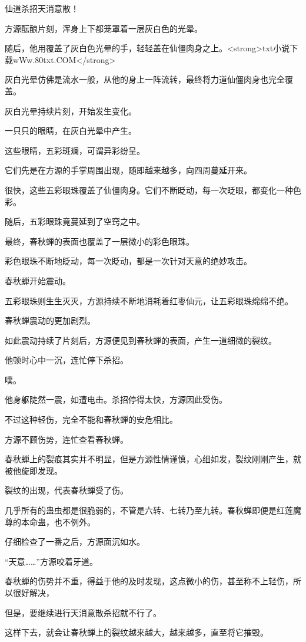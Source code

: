 \begin{this_body}
仙道杀招天消意散！

方源酝酿片刻，浑身上下都笼罩着一层灰白色的光晕。

随后，他用覆盖了灰白色光晕的手，轻轻盖在仙僵肉身之上。<strong>txt小说下载wWw.80txt.COM</strong>

灰白光晕仿佛是流水一般，从他的身上一阵流转，最终将力道仙僵肉身也完全覆盖。

灰白光晕持续片刻，开始发生变化。

一只只的眼睛，在灰白光晕中产生。

这些眼睛，五彩斑斓，可谓异彩纷呈。

它们先是在方源的手掌周围出现，随即越来越多，向四周蔓延开来。

很快，这些五彩眼珠覆盖了仙僵肉身。它们不断眨动，每一次眨眼，都变化一种色彩。

随后，五彩眼珠竟蔓延到了空窍之中。

最终，春秋蝉的表面也覆盖了一层微小的彩色眼珠。

彩色眼珠不断地眨动，每一次眨动，都是一次针对天意的绝妙攻击。

春秋蝉开始震动。

五彩眼珠则生生灭灭，方源持续不断地消耗着红枣仙元，让五彩眼珠绵绵不绝。

春秋蝉震动的更加剧烈。

如此震动持续了片刻后，方源便见到春秋蝉的表面，产生一道细微的裂纹。

他顿时心中一沉，连忙停下杀招。

噗。

他身躯陡然一震，如遭电击。杀招停得太快，方源因此受伤。

不过这种轻伤，完全不能和春秋蝉的安危相比。

方源不顾伤势，连忙查看春秋蝉。

春秋蝉上的裂痕其实并不明显，但是方源性情谨慎，心细如发，裂纹刚刚产生，就被他旋即发现。

裂纹的出现，代表春秋蝉受了伤。

几乎所有的蛊虫都是很脆弱的，不管是六转、七转乃至九转。春秋蝉即便是红莲魔尊的本命蛊，也不例外。

仔细检查了一番之后，方源面沉如水。

“天意……”方源咬着牙道。

春秋蝉的伤势并不重，得益于他的及时发现，这点微小的伤，甚至称不上轻伤，所以很好解决，

但是，要继续进行天消意散杀招就不行了。

这样下去，就会让春秋蝉上的裂纹越来越大，越来越多，直至将它摧毁。


\end{this_body}
